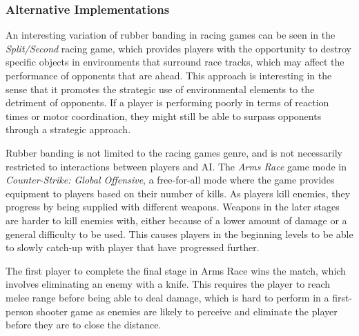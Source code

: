 
\subsubsection{Alternative Implementations}
\label{sec:alternative-rubber-banding}

An interesting variation of rubber banding in racing games can be seen in the \emph{Split/Second} racing game, which provides players with the opportunity to destroy specific objects in environments that surround race tracks, which may affect the performance of opponents that are ahead. This approach is interesting in the sense that it promotes the strategic use of environmental elements to the detriment of opponents. If a player is performing poorly in terms of reaction times or motor coordination, they might still be able to surpass opponents through a strategic approach.

Rubber banding is not limited to the racing games genre, and is not necessarily restricted to interactions between players and AI. The \emph{Arms Race} game mode in \emph{Counter-Strike: Global Offensive}, a free-for-all mode where the game provides equipment to players based on their number of kills. As players kill enemies, they progress by being supplied with different weapons. Weapons in the later stages are harder to kill enemies with, either because of a lower amount of damage or a general difficulty to be used. This causes players in the beginning levels to be able to slowly catch-up with player that have progressed further.

The first player to complete the final stage in Arms Race wins the match, which involves eliminating an enemy with a knife. This requires the player to reach melee range before being able to deal damage, which is hard to perform in a first-person shooter game as enemies are likely to perceive and eliminate the player before they are to close the distance.

